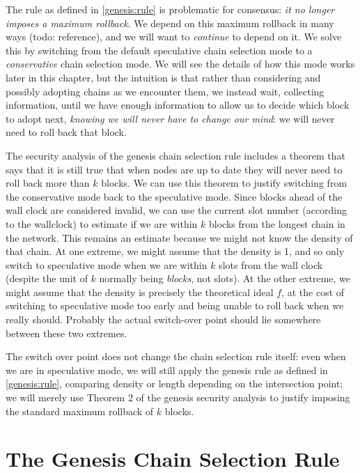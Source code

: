 The rule as defined in \cref{genesis:rule} is problematic for consensus:
\emph{it no longer imposes a maximum rollback}. We depend on this maximum
rollback in many ways (todo: reference), and we will want to \emph{continue}
to depend on it. We solve this by switching from the default
speculative chain selection mode to a \emph{conservative} chain selection mode.
We will see the details of how this mode works later in this chapter, but
the intuition is that rather than considering and possibly adopting chains as we
encounter them, we instead wait, collecting information, until we have enough
information to allow us to decide which block to adopt next, \emph{knowing we
will never have to change our mind}: we will never need to roll back that
block.

The security analysis of the genesis chain selection rule includes a theorem
\cite[Theorem 2]{cryptoeprint:2018:378} that says that it is still true that
when nodes are up to date they will never need to roll back more than $k$
blocks. We can use this theorem to justify switching from the conservative
mode back to the speculative mode. Since blocks ahead of the wall clock are
considered invalid, we can use the current slot number (according to the
wallclock) to estimate if we are within $k$ blocks from the longest chain
in the network. This remains an estimate because we might not know the
density of that chain. At one extreme, we might assume that the density is
1, and so only switch to speculative mode when we are within $k$ slots from the
wall clock (despite the unit of $k$ normally being \emph{blocks}, not slots). At
the other extreme, we might assume that the density is precisely the theoretical
ideal $f$, at the cost of switching to speculative mode too early and being
unable to roll back when we really should. Probably the actual switch-over point
should lie somewhere between these two extremes.

The switch over point does not change the chain selection rule itself: even when
we are in speculative mode, we will still apply the genesis rule as defined in
\cref{genesis:rule}, comparing density or length depending on the intersection
point; we will merely use Theorem 2 of the genesis security analysis to justify
imposing the standard maximum rollback of $k$ blocks.


\pagebreak
{}

\section{The Genesis Chain Selection Rule}

